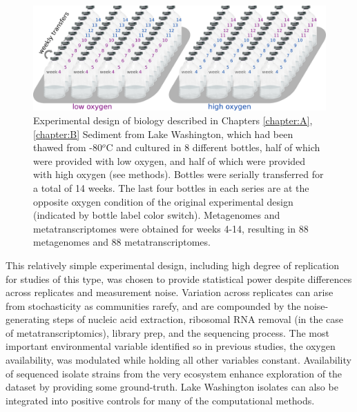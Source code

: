 \begin{figure}[H]
\centering
    \includegraphics[width=1.0\textwidth]{./tex/chapter2/figures/170311_experimental_design_meta4--2_colors.png}
    \begin{singlespace}
    \caption[Experimental design for the data underlying Chapters \ref{chapter:A}, \ref{chapter:B}]{
	Experimental design of biology described in Chapters \ref{chapter:A}, \ref{chapter:B}
	Sediment from Lake Washington, which had been thawed from -80$^o$C and cultured in 8 different bottles,
        half of which were provided with low oxygen, and half of which were provided with high oxygen (see methods).
	   Bottles were serially transferred for a total of 14 weeks.
	   The last four bottles in each series are at the opposite oxygen condition of the original experimental design
        (indicated by bottle label color switch).
	   Metagenomes and metatranscriptomes were obtained for weeks 4-14, resulting in 88 metagenomes and 88 metatranscriptomes.
	   }
    \label{fig:experimental_design}
    \end{singlespace}
\end{figure}

This relatively simple experimental design, including high degree of replication for studies of this type, was chosen to provide statistical power despite differences across replicates and measurement noise.
Variation across replicates can arise from stochasticity as communities rarefy, and are compounded by the noise-generating steps of nucleic acid extraction, ribosomal RNA removal (in the case of metatranscriptomics), library prep, and the sequencing process.
The most important environmental variable identified so in previous studies, the oxygen availability, was modulated while holding all other variables constant.
Availability of sequenced isolate strains from the very ecosystem enhance exploration of the dataset by providing some ground-truth.
Lake Washington isolates can also be integrated into positive controls for many of the computational methods.

